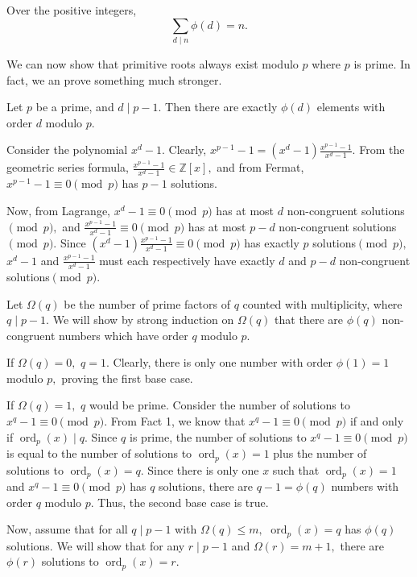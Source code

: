 \documentclass{article}
\begin{document}
\begin{fact}
Over the positive integers,
$$\sum_{d \mid n} \phi(d) = n.$$
\end{fact}
We can now show that primitive roots always exist modulo $p$ where $p$ is prime. In fact, we an prove something much stronger.

\begin{theo}
Let $p$ be a prime, and $d \mid p-1.$ Then there are exactly $\phi(d)$ elements with order $d$ modulo $p.$
\end{theo}

\begin{pro}
Consider the polynomial $x^d - 1.$ Clearly, $x^{p-1} - 1 = (x^d - 1) \frac{x^{p-1}-1}{x^d-1}.$ From the geometric series formula, $\frac{x^{p-1}-1}{x^d-1} \in \mathbb{Z}[x],$ and from Fermat, $x^{p-1}-1 \equiv 0 \pmod{p}$ has $p-1$ solutions.

Now, from Lagrange, $x^d - 1 \equiv 0 \pmod{p}$ has at most $d$ non-congruent solutions$\pmod{p},$ and $\frac{x^{p-1}-1}{x^d-1} \equiv 0 \pmod{p}$ has at most $p - d$ non-congruent solutions$\pmod{p}.$ Since $(x^d - 1) \frac{x^{p-1}-1}{x^d-1} \equiv 0 \pmod{p}$ has exactly $p$ solutions$\pmod{p},$ $x^d-1$ and $\frac{x^{p-1}-1}{x^d-1}$ must each respectively have exactly $d$ and $p-d$ non-congruent solutions$\pmod{p}.$

Let $\Omega(q)$ be the number of prime factors of $q$ counted with multiplicity, where $q \mid p-1.$ We will show by strong induction on $\Omega(q)$ that there are $\phi(q)$ non-congruent numbers which have order $q$ modulo $p.$

If $\Omega(q) = 0,$ $q = 1.$ Clearly, there is only one number with order $\phi(1) = 1$ modulo $p,$ proving the first base case.

If $\Omega(q) = 1,$ $q$ would be prime. Consider the number of solutions to $x^q - 1 \equiv 0 \pmod{p}.$ From Fact 1, we know that $x^q - 1 \equiv 0 \pmod{p}$ if and only if $\operatorname{ord}_p(x) \mid q.$ Since $q$ is prime, the number of solutions to $x^q - 1 \equiv 0 \pmod{p}$ is equal to the number of solutions to $\operatorname{ord}_p(x) = 1$ plus the number of solutions to $\operatorname{ord}_p(x) = q.$ Since there is only one $x$ such that $\operatorname{ord}_p(x) = 1$ and $x^q - 1 \equiv 0 \pmod{p}$ has $q$ solutions, there are $q-1 = \phi(q)$ numbers with order $q$ modulo $p.$ Thus, the second base case is true.

Now, assume that for all $q \mid p-1$ with $\Omega(q) \le m,$ $\operatorname{ord}_p(x) = q$ has $\phi(q)$ solutions. We will show that for any $r \mid p-1$ and $\Omega(r) = m+1,$ there are $\phi(r)$ solutions to $\operatorname{ord}_p(x) = r.$


\end{pro}
\end{document}
